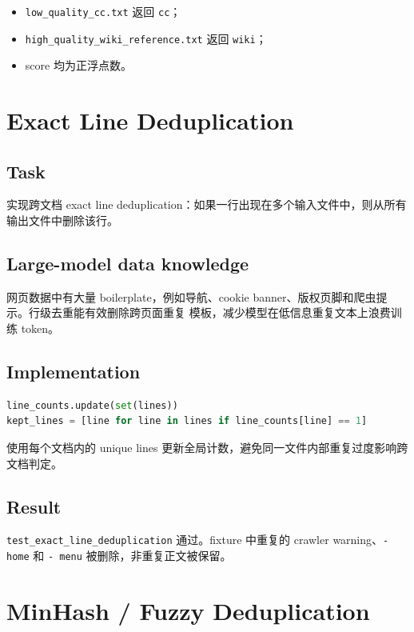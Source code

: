 \documentclass[UTF8,11pt]{ctexart}
\begin{document}
\begin{itemize}
  \item \texttt{low\_quality\_cc.txt} 返回 \texttt{cc}；
  \item \texttt{high\_quality\_wiki\_reference.txt} 返回 \texttt{wiki}；
  \item score 均为正浮点数。
\end{itemize}

\section{Exact Line Deduplication}

\subsection*{Task}

实现跨文档 exact line deduplication：如果一行出现在多个输入文件中，则从所有输出文件中删除该行。

\subsection*{Large-model data knowledge}

网页数据中有大量 boilerplate，例如导航、cookie banner、版权页脚和爬虫提示。行级去重能有效删除跨页面重复
模板，减少模型在低信息重复文本上浪费训练 token。

\subsection*{Implementation}

\begin{lstlisting}[language=Python]
line_counts.update(set(lines))
kept_lines = [line for line in lines if line_counts[line] == 1]
\end{lstlisting}

使用每个文档内的 unique lines 更新全局计数，避免同一文件内部重复过度影响跨文档判定。

\subsection*{Result}

\texttt{test\_exact\_line\_deduplication} 通过。fixture 中重复的 crawler warning、\texttt{- home} 和
\texttt{- menu} 被删除，非重复正文被保留。

\section{MinHash / Fuzzy Deduplication}
\end{document}
